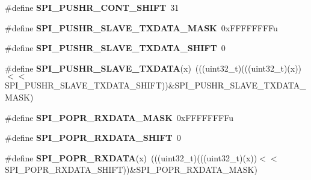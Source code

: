 \begin{DoxyCompactItemize}
\item 
\#define {\bfseries S\+P\+I\+\_\+\+P\+U\+S\+H\+R\+\_\+\+C\+O\+N\+T\+\_\+\+S\+H\+I\+FT}~31\hypertarget{group__SPI__Register__Masks_gab114a13d8478311e8b77778d4cbd5d96}{}\label{group__SPI__Register__Masks_gab114a13d8478311e8b77778d4cbd5d96}

\item 
\#define {\bfseries S\+P\+I\+\_\+\+P\+U\+S\+H\+R\+\_\+\+S\+L\+A\+V\+E\+\_\+\+T\+X\+D\+A\+T\+A\+\_\+\+M\+A\+SK}~0x\+F\+F\+F\+F\+F\+F\+F\+Fu\hypertarget{group__SPI__Register__Masks_ga70296421b5faddc6c9fbbb984685b5a0}{}\label{group__SPI__Register__Masks_ga70296421b5faddc6c9fbbb984685b5a0}

\item 
\#define {\bfseries S\+P\+I\+\_\+\+P\+U\+S\+H\+R\+\_\+\+S\+L\+A\+V\+E\+\_\+\+T\+X\+D\+A\+T\+A\+\_\+\+S\+H\+I\+FT}~0\hypertarget{group__SPI__Register__Masks_gaa965b8c34dc45034184a2cad39a0b825}{}\label{group__SPI__Register__Masks_gaa965b8c34dc45034184a2cad39a0b825}

\item 
\#define {\bfseries S\+P\+I\+\_\+\+P\+U\+S\+H\+R\+\_\+\+S\+L\+A\+V\+E\+\_\+\+T\+X\+D\+A\+TA}(x)~(((uint32\+\_\+t)(((uint32\+\_\+t)(x))$<$$<$S\+P\+I\+\_\+\+P\+U\+S\+H\+R\+\_\+\+S\+L\+A\+V\+E\+\_\+\+T\+X\+D\+A\+T\+A\+\_\+\+S\+H\+I\+FT))\&S\+P\+I\+\_\+\+P\+U\+S\+H\+R\+\_\+\+S\+L\+A\+V\+E\+\_\+\+T\+X\+D\+A\+T\+A\+\_\+\+M\+A\+SK)\hypertarget{group__SPI__Register__Masks_ga5833d343153e57cb3493f85b0342989e}{}\label{group__SPI__Register__Masks_ga5833d343153e57cb3493f85b0342989e}

\item 
\#define {\bfseries S\+P\+I\+\_\+\+P\+O\+P\+R\+\_\+\+R\+X\+D\+A\+T\+A\+\_\+\+M\+A\+SK}~0x\+F\+F\+F\+F\+F\+F\+F\+Fu\hypertarget{group__SPI__Register__Masks_ga3d2d3998529fd7de17cac99d625fe004}{}\label{group__SPI__Register__Masks_ga3d2d3998529fd7de17cac99d625fe004}

\item 
\#define {\bfseries S\+P\+I\+\_\+\+P\+O\+P\+R\+\_\+\+R\+X\+D\+A\+T\+A\+\_\+\+S\+H\+I\+FT}~0\hypertarget{group__SPI__Register__Masks_ga862819a722e0ccbd3f03edce9b82e5c2}{}\label{group__SPI__Register__Masks_ga862819a722e0ccbd3f03edce9b82e5c2}

\item 
\#define {\bfseries S\+P\+I\+\_\+\+P\+O\+P\+R\+\_\+\+R\+X\+D\+A\+TA}(x)~(((uint32\+\_\+t)(((uint32\+\_\+t)(x))$<$$<$S\+P\+I\+\_\+\+P\+O\+P\+R\+\_\+\+R\+X\+D\+A\+T\+A\+\_\+\+S\+H\+I\+FT))\&S\+P\+I\+\_\+\+P\+O\+P\+R\+\_\+\+R\+X\+D\+A\+T\+A\+\_\+\+M\+A\+SK)\hypertarget{group__SPI__Register__Masks_gae6858b63bc7af767270dafed1e9c5060}{}\label{group__SPI__Register__Masks_gae6858b63bc7af767270dafed1e9c5060}


\end{DoxyCompactItemize}
